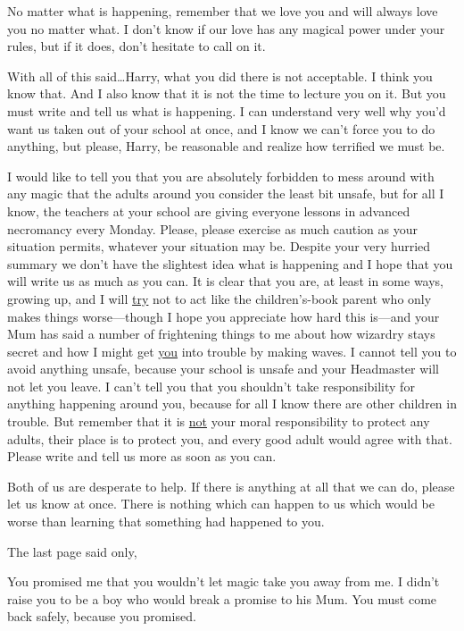 \begin{writtenNote}
No matter what is happening, remember that we love you and will always love you no matter what. I don’t know if our love has any magical power under your rules, but if it does, don’t hesitate to call on it.

With all of this said…Harry, what you did there is not
acceptable. I think you know that. And I also know that it is not the time to lecture you on it. But you must write and tell us what is happening. I can understand very well why you’d want us taken out of your school at once, and I know we can’t force you to do anything, but please, Harry, be reasonable and realize how terrified we must be.

I would like to tell you that you are absolutely forbidden to mess around with any magic that the adults around you consider the least bit unsafe, but for all I know, the teachers at your school are giving everyone lessons in advanced necromancy every Monday. Please, please exercise as much caution as your situation permits, whatever your situation may be. Despite your very hurried summary we don’t have the slightest idea what is happening and I hope that you will write us as much as you can. It is clear that you are, at least in some ways, growing up, and I will \underline{try} not to act like the children’s-book parent who only makes things worse—though I hope you appreciate how hard this is—and your Mum has said a number of frightening things to me about how wizardry stays secret and how I might get \underline{you} into trouble by making waves. I cannot tell you to avoid anything unsafe, because your school is unsafe and your Headmaster will not let you leave. I can’t tell you that you shouldn’t take responsibility for anything happening around you, because for all I know there are other children in trouble. But remember that it is \underline{not} your moral responsibility to protect any adults, their place is to protect you, and every good adult would agree with that. Please write and tell us more as soon as you can.

Both of us are desperate to help. If there is anything at all that we can do, please let us know at once. There is nothing which can happen to us which would be worse than learning that something had happened to you.

\end{writtenNote}

The last page said only,

\begin{writtenNote}
You promised me that you wouldn’t let magic take you away from me. I didn’t raise you to be a boy who would break a promise to his Mum. You must come back safely, because you promised.

\end{writtenNote}

